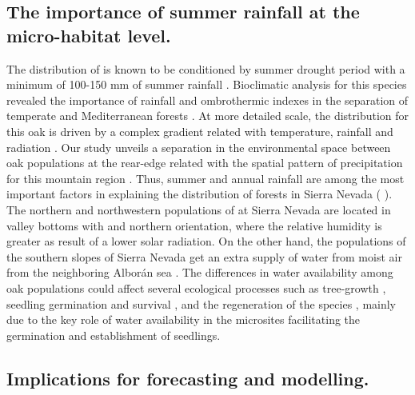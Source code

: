 \subsection{The importance of summer rainfall at the micro-habitat level.}\label{sec:multivarSummerRainfall}
The distribution of \Qp is known to be conditioned by summer drought period with a minimum of 100-150 mm of summer rainfall \autocite{BlancoCastroetal2005BosquesIbericos,GarciaJimenez20099230Robledales}. Bioclimatic analysis for this species revealed the importance of rainfall and ombrothermic indexes in the separation of temperate and Mediterranean forests \autocite{delRioetal2007BioclimaticAnalysis}. At more detailed scale, the distribution for this oak is driven by a complex gradient related with temperature, rainfall and radiation \autocite{Gavilanetal2007ModellingCurrent,Urbietaetal2011MediterraneanPine}. Our study unveils a separation in the environmental space between oak populations at the rear-edge related with the spatial pattern of precipitation for this mountain region \autocite{Pereiraetal2016SpatialInterpolation}. Thus, summer and annual rainfall are among the most important factors in explaining the distribution of \Qp forests in Sierra Nevada ( ). The northern and northwestern populations of \Qp at Sierra Nevada are located in valley bottoms with and northern orientation, where the relative humidity is greater as result of a lower solar radiation. On the other hand, the populations of the southern slopes of Sierra Nevada get an extra supply of water from moist air from the neighboring Alborán sea \autocite{MartinezParrasMoleroMesa1982EcologiaFitosociologia}. The differences in water availability among oak populations could affect several ecological processes such as tree-growth \autocite{GeaIzquierdoCanellas2014LocalClimate,PerezLuqueetal2020LanduseLegacies}, seedling germination and survival \autocite{Gomez2003ImpactVertebrate,GomezAparicioetal2008OakSeedling,Mendozaetal2009SeedingExperiment}, and the regeneration of the species \autocite{Gomezetal2001ProblemasRegeneracion}, mainly due to the key role of water availability in the microsites facilitating the germination and establishment of seedlings.

\subsection{Implications for forecasting and modelling.}\label{sec:multivar:ImplicaForecast}

